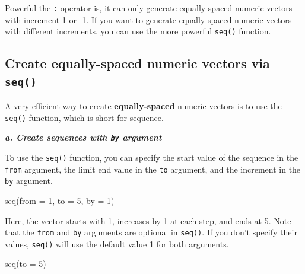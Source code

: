 \documentclass[
]{book}
\newenvironment{Shaded}{\begin{snugshade}}{\end{snugshade}}
\newcommand{\AttributeTok}[1]{\textcolor[rgb]{0.77,0.63,0.00}{#1}}
\newcommand{\DecValTok}[1]{\textcolor[rgb]{0.00,0.00,0.81}{#1}}
\newcommand{\FunctionTok}[1]{\textcolor[rgb]{0.00,0.00,0.00}{#1}}
\newcommand{\NormalTok}[1]{#1}
\begin{document}
Powerful the \texttt{:} operator is, it can only generate equally-spaced numeric vectors with increment 1 or -1. If you want to generate equally-spaced numeric vectors with different increments, you can use the more powerful \texttt{seq()} function.

\hypertarget{create-equally-spaced-numeric-vectors-via-seq}{%
\subsection{\texorpdfstring{Create equally-spaced numeric vectors via \texttt{seq()}}{Create equally-spaced numeric vectors via seq()}}\label{create-equally-spaced-numeric-vectors-via-seq}}

A very efficient way to create \textbf{equally-spaced} numeric vectors is to use the \texttt{seq()} function, which is short for sequence.

\textbf{\emph{a. Create sequences with \texttt{by} argument}}

To use the \texttt{seq()} function, you can specify the start value of the sequence in the \texttt{from} argument, the limit end value in the \texttt{to} argument, and the increment in the \texttt{by} argument.

\begin{Shaded}
\begin{Highlighting}[]
\FunctionTok{seq}\NormalTok{(}\AttributeTok{from =} \DecValTok{1}\NormalTok{, }\AttributeTok{to =} \DecValTok{5}\NormalTok{, }\AttributeTok{by =} \DecValTok{1}\NormalTok{)}
\end{Highlighting}
\end{Shaded}

Here, the vector starts with 1, increases by 1 at each step, and ends at 5. Note that the \texttt{from} and \texttt{by} arguments are optional in \texttt{seq()}. If you don't specify their values, \texttt{seq()} will use the default value 1 for both arguments.

\begin{Shaded}
\begin{Highlighting}[]
\FunctionTok{seq}\NormalTok{(}\AttributeTok{to =} \DecValTok{5}\NormalTok{)}
\end{Highlighting}
\end{Shaded}
\end{document}
